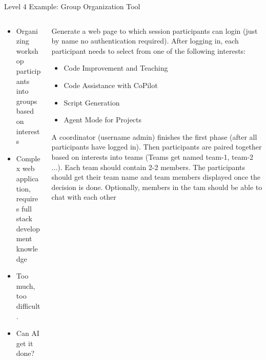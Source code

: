 \documentclass[xcolor=dvipsnames, aspectratio=169]{beamer}
\begin{document}
\begin{frame}{Level 4 Example: Group Organization Tool}
  \begin{columns}
    \begin{column}{0.5\textwidth}
      \begin{itemize}
        \item Organizing workshop participants into groups based on interests
        \item Complex web application, requires full stack development knowledge
        \item Too much, too difficult.
        \item Can AI get it done?
      \end{itemize}
    \end{column}
    
    \begin{column}{0.5\textwidth}
      \begin{promptbox}\footnotesize
        Generate a web page to which session participants can login (just by name no authentication required). After logging in, each participant needs to select from one of the following interests:
        \begin{itemize}\vspace{-0.5em}
          \item Code Improvement and Teaching
          \vspace{-0.5em}
          \item Code Assistance with CoPilot
          \vspace{-0.5em}
          \item Script Generation
          \vspace{-0.5em}
          \item Agent Mode for Projects
          \vspace{-0.5em}
       \end{itemize}
A coordinator (username admin) finishes the first phase (after all participants have logged in). Then participants are paired together based on interests into teams (Teams get named team-1, team-2 ...). Each team should contain 2-2 members. The participants should get their team name and team members displayed once the decision is done. Optionally, members in the tam should be able to chat with each other
      \end{promptbox}
    \end{column}
  \end{columns}
\end{frame}
\end{document}
